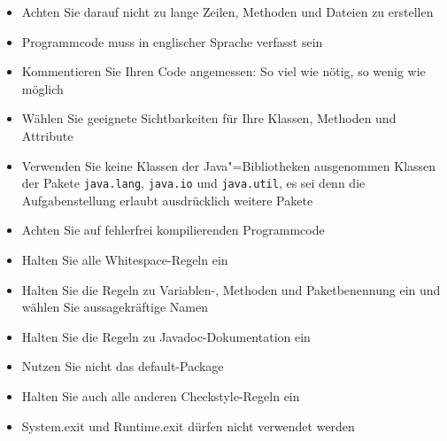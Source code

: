 \addtocounter{footnote}{1}\setcounter{required}{\value{footnote}}
\begin{itemize}
\item Achten Sie darauf nicht zu lange Zeilen, Methoden und Dateien zu erstellen\footnotemark[\value{required}]
\item Programmcode muss in englischer Sprache verfasst sein
\item Kommentieren Sie Ihren Code angemessen: So viel wie nötig, so wenig wie möglich
\item Wählen Sie geeignete Sichtbarkeiten für Ihre Klassen, Methoden und Attribute
\item Verwenden Sie keine Klassen der Java"=Bibliotheken ausgenommen Klassen der Pakete \texttt{java.lang}, \texttt{java.io} und \texttt{java.util}, es sei denn die Aufgabenstellung erlaubt ausdrücklich weitere Pakete\footnotemark[\value{required}]
\item Achten Sie auf fehlerfrei kompilierenden Programmcode\footnotemark[\value{required}]
\item Halten Sie alle Whitespace-Regeln ein\footnotemark[\value{required}]
\item Halten Sie die Regeln zu Variablen-, Methoden und Paketbenennung ein und wählen Sie aussagekräftige Namen\footnotemark[\value{required}]
\item Halten Sie die Regeln zu Javadoc-Dokumentation ein\footnotemark[\value{required}]
\item Nutzen Sie nicht das default-Package\footnotemark[\value{required}]
\item Halten Sie auch alle anderen Checkstyle-Regeln ein%
\item System.exit und Runtime.exit dürfen nicht verwendet werden\footnotemark[\value{required}]
\end{itemize}

